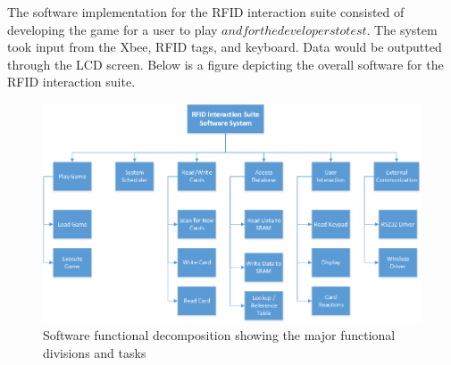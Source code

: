 \documentclass[12pt]{article} %
\begin{document}
The software implementation for the RFID interaction suite consisted of developing the game for a user to play \(and for the developers to test\). The system took input from the Xbee, RFID tags, and keyboard. Data would be outputted through the LCD screen. Below is a figure depicting the overall software for the RFID interaction suite. 

\begin{figure}[H]
	\centering
	\includegraphics[width=\textwidth]{images/funDecomp.png}
	\caption{Software functional decomposition showing the major functional divisions and tasks}
	\label{fig:funDecomp}
\end{figure}
\end{document}
